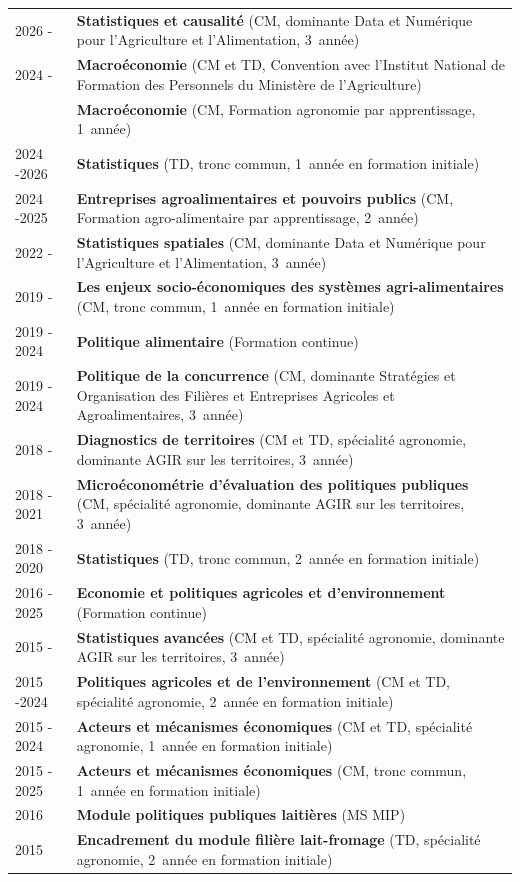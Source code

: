 \documentclass[a4paper,12pt]{article}
\begin{document}
\noindent \begin{longtable}{@{}p{\annee}p{\texte}@{}}	
2026 - 	&  \textbf{Statistiques et causalité} (CM, dominante Data et Numérique pour l'Agriculture et l'Alimentation, 3\ieme{}~année) \\
2024 - 	&  \textbf{Macroéconomie} (CM et TD, Convention avec l'Institut National de Formation des Personnels du Ministère de l'Agriculture) \\
		&  \textbf{Macroéconomie} (CM, Formation agronomie par apprentissage, 1\iere{}~année) \\		
2024 -2026	& \textbf{Statistiques} (TD, tronc commun, 1\iere{}~année en formation initiale) \\	
2024 -2025	&  \textbf{Entreprises agroalimentaires et pouvoirs publics} (CM, Formation agro-alimentaire par apprentissage, 2\ieme{}~année) \\	
2022 - 	&  \textbf{Statistiques spatiales} (CM, dominante Data et Numérique pour l'Agriculture et l'Alimentation, 3\ieme{}~année) \\
2019 -	& \textbf{Les enjeux socio-économiques des systèmes agri-alimentaires} (CM, tronc commun, 1\iere{}~année en formation initiale) \\
2019 - 2024	& \textbf{Politique alimentaire} (Formation continue) \\
2019 - 2024	& \textbf{Politique de la concurrence} (CM, dominante Stratégies et Organisation des Filières et Entreprises Agricoles et Agroalimentaires, 3\ieme{}~année) \\
2018 -	& \textbf{Diagnostics de territoires} (CM et TD, spécialité agronomie, dominante AGIR sur les territoires, 3\ieme{}~année) \\
2018 - 2021 & \textbf{Microéconométrie d'évaluation des politiques publiques} (CM, spécialité agronomie, dominante AGIR sur les territoires, 3\ieme{}~année) \\
2018 - 2020	& \textbf{Statistiques} (TD, tronc commun, 2\ieme{}~année en formation initiale) \\
2016 - 2025	& \textbf{Economie et politiques agricoles et d'environnement} (Formation continue) \\
2015 -	& \textbf{Statistiques avancées} (CM et TD, spécialité agronomie, dominante AGIR sur les territoires, 3\ieme{}~année) \\
2015 -2024	& \textbf{Politiques agricoles et de l'environnement} (CM et TD, spécialité agronomie, 2\ieme{}~année en formation initiale) \\
2015 - 2024	& \textbf{Acteurs et mécanismes économiques} (CM et TD, spécialité agronomie, 1\iere{}~année en formation initiale) \\
2015 - 2025	& \textbf{Acteurs et mécanismes économiques} (CM, tronc commun, 1\iere{}~année en formation initiale) \\
2016		& \textbf{Module politiques publiques laitières} (MS MIP) \\	
2015		& \textbf{Encadrement du module filière lait-fromage} (TD, spécialité agronomie, 2\ieme{}~année en formation initiale) \\
\end{longtable}
\end{document}
